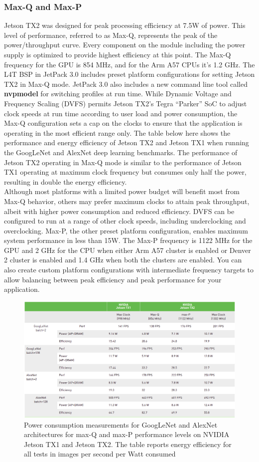         \subsubsection{Max-Q and Max-P}
            Jetson TX2 was designed for peak processing efficiency at 7.5W of power. This level of performance, referred to as Max-Q, represents the peak of the power/throughput curve. Every component on the module including the power supply is optimized to provide highest efficiency at this point. 
            The Max-Q frequency for the GPU is 854 MHz, and for the Arm A57 CPUs it’s 1.2 GHz. The L4T BSP in JetPack 3.0 includes preset platform configurations for setting Jetson TX2 in Max-Q mode. JetPack 3.0 also includes a new command line tool called \textbf{nvpmodel} for switching profiles at run time. 
            While Dynamic Voltage and Frequency Scaling (DVFS) permits Jetson TX2’s Tegra “Parker” SoC to adjust clock speeds at run time according to user load and power consumption, the Max-Q configuration sets a cap on the clocks to ensure that the application is operating in the most efficient 
            range only. The table below here shows the performance and energy efficiency of Jetson TX2 and Jetson TX1 when running the GoogLeNet and AlexNet deep learning benchmarks. The performance of Jetson TX2 operating in Max-Q mode is similar to the performance of Jetson TX1 operating at maximum 
            clock frequency but consumes only half the power, resulting in double the energy efficiency. \\ 
            \vspace{3mm}
            Although most platforms with a limited power budget will benefit most from Max-Q behavior, others may prefer maximum clocks to attain peak throughput, albeit with higher power consumption and reduced efficiency. DVFS can be configured to run at a range of other clock speeds, including 
            underclocking and overclocking. Max-P, the other preset platform configuration, enables maximum system performance in less than 15W. The Max-P frequency is 1122 MHz for the GPU and 2 GHz for the CPU when either Arm A57 cluster is enabled or Denver 2 cluster is enabled and 1.4 GHz when 
            both the clusters are enabled. You can also create custom platform configurations with intermediate frequency targets to allow balancing between peak efficiency and peak performance for your application.
            \begin{figure}[H]
                \centering
                \includegraphics[width=0.6\linewidth]{img/AletNet.png}
                \caption{Power consumption measurements for GoogLeNet and AlexNet architectures for max-Q and max-P performance levels on NVIDIA Jetson TX1 and Jetson TX2. The table reports energy efficiency for all tests in images per second per Watt consumed}
            \end{figure}
